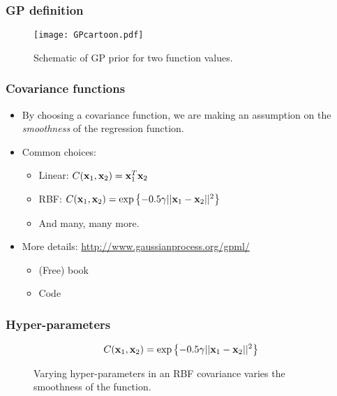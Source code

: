 \begin{frame}
	\frametitle{GP definition}
	\begin{figure}[tbh]
		\texttt{[image: GPcartoon.pdf]}		
		\centering\caption{\label{fig:GPcartoon}Schematic of GP prior for two function values.}
	\end{figure}
\end{frame}


\begin{frame}
	\frametitle{Covariance functions}
	\begin{itemize}
		\item By choosing a covariance function, we are making an assumption on the \emph{smoothness} of the regression function.
		\item Common choices:
		\begin{itemize}
			\item Linear: $C(\mathbf{x}_1,\mathbf{x}_2) = \mathbf{x}_1^T\mathbf{x}_2$
			\item RBF: $C(\mathbf{x}_1,\mathbf{x}_2) = \exp\left\{-0.5\gamma ||\mathbf{x}_1 - \mathbf{x}_2||^2 \right\}$
			\item And many, many more.
		\end{itemize}
		\item More details: \url{http://www.gaussianprocess.org/gpml/}
		\begin{itemize}
			\item (Free) book
			\item Code
		\end{itemize}
	\end{itemize}
\end{frame}

\begin{frame}
	\frametitle{Hyper-parameters}
	\[
C(\mathbf{x}_1,\mathbf{x}_2) = \exp\left\{-0.5\gamma ||\mathbf{x}_1 - \mathbf{x}_2||^2 \right\}
	\]
	\begin{figure}[tbh]
		\centering\caption{\label{fig:hyper}Varying hyper-parameters in an RBF covariance varies the smoothness of the function.}
	\end{figure}
\end{frame}



